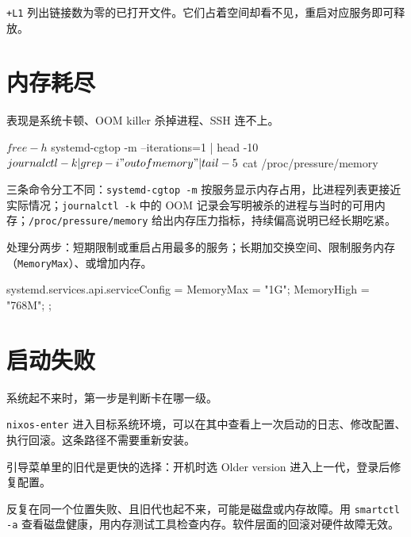 \texttt{+L1} 列出链接数为零的已打开文件。它们占着空间却看不见，重启对应服务即可释放。

\section{内存耗尽}

表现是系统卡顿、OOM killer 杀掉进程、SSH 连不上。

\begin{shellsession}
$ free -h
$ systemd-cgtop -m --iterations=1 | head -10
$ journalctl -k | grep -i "out of memory" | tail -5
$ cat /proc/pressure/memory
\end{shellsession}

三条命令分工不同：\texttt{systemd-cgtop -m} 按服务显示内存占用，比进程列表更接近实际情况；\texttt{journalctl -k} 中的 OOM 记录会写明被杀的进程与当时的可用内存；\texttt{/proc/pressure/memory} 给出内存压力指标，持续偏高说明已经长期吃紧。

处理分两步：短期限制或重启占用最多的服务；长期加交换空间、限制服务内存（\texttt{MemoryMax}）、或增加内存。

\begin{nixcode}
systemd.services.api.serviceConfig = {
  MemoryMax = "1G";
  MemoryHigh = "768M";
};
\end{nixcode}

\section{启动失败}

系统起不来时，第一步是判断卡在哪一级。


\texttt{nixos-enter} 进入目标系统环境，可以在其中查看上一次启动的日志、修改配置、执行回滚。这条路径不需要重新安装。

引导菜单里的旧代是更快的选择：开机时选 Older version 进入上一代，登录后修复配置。

\begin{warnbox}[先确认不是硬件]
反复在同一个位置失败、且旧代也起不来，可能是磁盘或内存故障。用 \texttt{smartctl -a} 查看磁盘健康，用内存测试工具检查内存。软件层面的回滚对硬件故障无效。
\end{warnbox}

